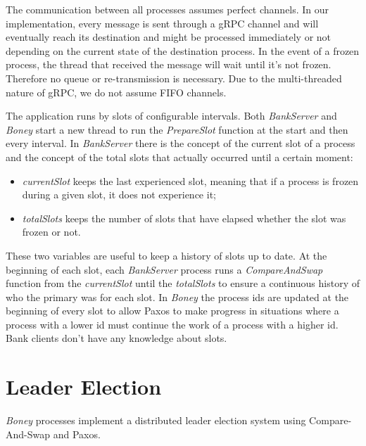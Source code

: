 \documentclass[times, 10pt,twocolumn]{article}
\begin{document}
The communication between all processes assumes perfect channels. In our implementation, every message is sent through a gRPC channel and will eventually reach its destination and might be processed immediately or not depending on the current state of the destination process. In the event of a frozen process, the thread that received the message will wait until it's not frozen. Therefore no queue or re-transmission is necessary. Due to the multi-threaded nature of gRPC, we do not assume FIFO channels.


The application runs by slots of configurable intervals. Both \textit{BankServer} and \textit{Boney} start a new thread to run the \textit{PrepareSlot} function at the start and then every interval. 
In \textit{BankServer} there is the concept of the current slot of a process and the concept of the total slots that actually occurred until a certain moment:
\begin{itemize}
  \item \textit{currentSlot} keeps the last experienced slot, meaning that if a process is frozen during a given slot, it does not experience it;
  \item \textit{totalSlots} keeps the number of slots that have elapsed whether the slot was frozen or not.
\end{itemize}
 
These two variables are useful to keep a history of slots up to date. At the beginning of each slot, each \textit{BankServer} process runs a \textit{CompareAndSwap} function from the \textit{currentSlot} until the \textit{totalSlots} to ensure a continuous history of who the primary was for each slot.
In \textit{Boney} the process ids are updated at the beginning of every slot to allow Paxos to make progress in situations where a process with a lower id must continue the work of a process with a higher id.
Bank clients don’t have any knowledge about slots.

\section{Leader Election}

\textit{Boney} processes implement a distributed leader election system using Compare-And-Swap and Paxos.

\end{document}
